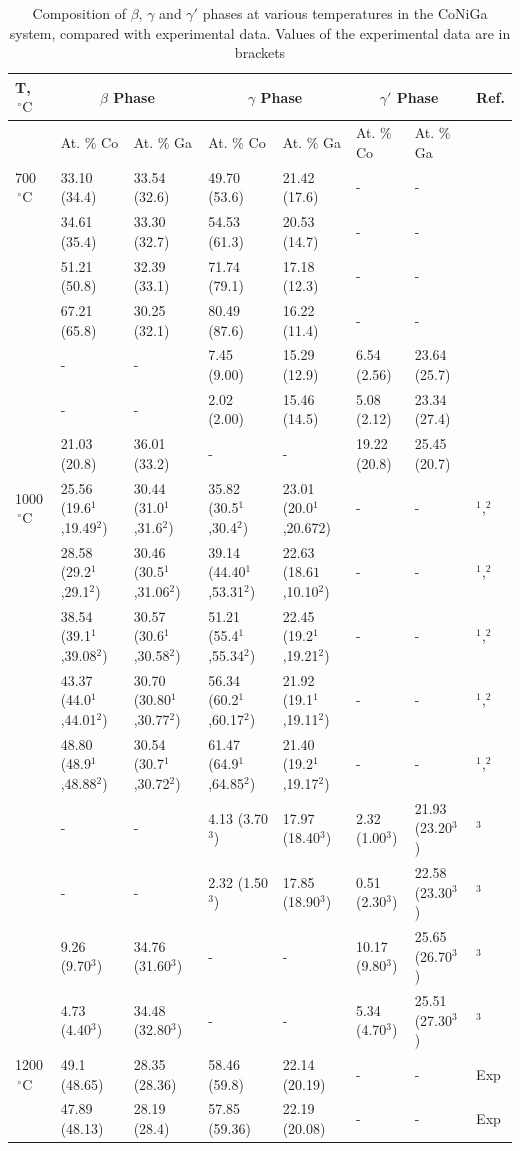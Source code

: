 \documentclass[article]{elsarticle}
\begin{document}
\begin{table}[t!]
\caption{Composition of $\beta$, $\gamma$ and $\gamma'$ phases
at various temperatures in the CoNiGa system, compared with experimental data. Values of the experimental data are in brackets}
{\small
\begin{tabular}{|p{3em}|p{6em}|p{6em}||p{6em}|p{6em}||p{6em}|p{6em}||p{3em}|}
\hline
T,$\,^{\circ}\mathrm{C}$ & \multicolumn{2}{c}{$\beta$ Phase} & \multicolumn{2}{c}{$\gamma$ Phase} & \multicolumn{2}{c}{$\gamma'$ Phase} & Ref. \\ \hline
& At. \% Co & At. \% Ga & At. \% Co & At. \% Ga & At. \% Co & At. \% Ga &  \tabularnewline \cline{2-7}
700$\,^{\circ}\mathrm{C}$ & 33.10 (34.4)& 33.54 (32.6) & 49.70 (53.6)& 21.42 (17.6)& - & - & \cite{Duch08} \tabularnewline
& 34.61 (35.4)& 33.30 (32.7)& 54.53 (61.3)& 20.53 (14.7)& - & - & \tabularnewline
& 51.21 (50.8)& 32.39 (33.1)& 71.74 (79.1)& 17.18 (12.3) & - & - & \tabularnewline
& 67.21 (65.8)& 30.25 (32.1)& 80.49 (87.6)& 16.22 (11.4)& - & - & \tabularnewline
& - & - & 7.45 (9.00)& 15.29 (12.9)& 6.54 (2.56)& 23.64 (25.7) & \tabularnewline
& - & - & 2.02 (2.00)& 15.46 (14.5)& 5.08 (2.12)& 23.34 (27.4) & \tabularnewline
& 21.03 (20.8) & 36.01 (33.2)& - & - & 19.22 (20.8)& 25.45 (20.7)& \tabularnewline
\hline
1000$\,^{\circ}\mathrm{C}$ & 25.56 (19.6$^1$,19.49$^2$)& 30.44 (31.0$^1$,31.6$^2$)& 35.82 (30.5$^1$,30.4$^2$) & 23.01 (20.0$^1$,20.67$2$)& - & - & \cite{Oik01}$^1$,\cite{Oik06}$^2$ \tabularnewline
& 28.58 (29.2$^1$,29.1$^2$)& 30.46 (30.5$^1$,31.06$^2$)& 39.14 (44.40$^1$,53.31$^2$)& 22.63 (18.6$1$,10.10$^2$)& - & - & \cite{Oik01}$^1$,\cite{Oik06}$^2$\tabularnewline
& 38.54 (39.1$^1$,39.08$^2$)& 30.57 (30.6$^1$,30.58$^2$)& 51.21 (55.4$^1$,55.34$^2$)& 22.45 (19.2$^1$,19.21$^2$)& - & - & \cite{Oik01}$^1$,\cite{Oik06}$^2$\tabularnewline
& 43.37 (44.0$^1$,44.01$^2$)& 30.70 (30.80$^1$,30.77$^2$) & 56.34 (60.2$^1$,60.17$^2$)& 21.92 (19.1$^1$,19.11$^2$)& - & - & \cite{Oik01}$^1$,\cite{Oik06}$^2$\tabularnewline
& 48.80 (48.9$^1$,48.88$^2$)& 30.54 (30.7$^1$,30.72$^2$)& 61.47 (64.9$^1$,64.85$^2$)& 21.40 (19.2$^1$,19.17$^2$)& - & - & \cite{Oik01}$^1$,\cite{Oik06}$^2$\tabularnewline
& - & - & 4.13 (3.70$^3$)& 17.97 (18.40$^3$)& 2.32 (1.00$^3$)& 21.93 (23.20$^3$)& \cite{Duch08}$^3$\tabularnewline
& - & - & 2.32 (1.50$^3$)& 17.85 (18.90$^3$)& 0.51 (2.30$^3$)& 22.58 (23.30$^3$)& \cite{Duch08}$^3$\tabularnewline
& 9.26 (9.70$^3$)& 34.76 (31.60$^3$)& - & - & 10.17 (9.80$^3$)& 25.65 (26.70$^3$)& \cite{Duch08}$^3$\tabularnewline
& 4.73 (4.40$^3$)& 34.48 (32.80$^3$)& - & - & 5.34 (4.70$^3$)& 25.51 (27.30$^3$)& \cite{Duch08}$^3$\tabularnewline
\hline
1200$\,^{\circ}\mathrm{C}$ & 49.1 (48.65)& 28.35 (28.36)& 58.46 (59.8)& 22.14 (20.19)& - & - & Exp\tabularnewline
& 47.89 (48.13)& 28.19 (28.4)& 57.85 (59.36)& 22.19 (20.08)& - & - & Exp\tabularnewline
\hline
\end{tabular}}
\label{Exp-2}
\end{table}
\end{document}
